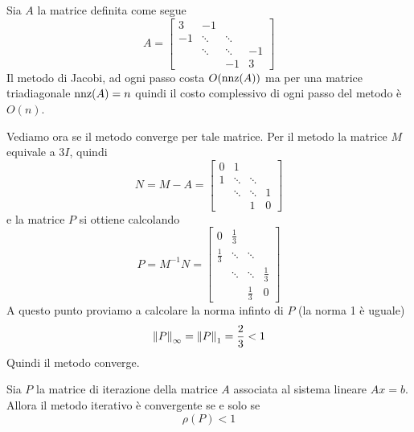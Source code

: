 \begin{example}
	Sia $A$ la matrice definita come segue
	\[
		A = \begin{bmatrix}
			3  & -1     &        &    \\
			-1 & \ddots & \ddots &    \\
			   & \ddots & \ddots & -1 \\
			   &        & -1     & 3
		\end{bmatrix}
	\]
	Il metodo di Jacobi, ad ogni passo costa $O(\operatorname{nnz}(A))$ ma per una matrice triadiagonale $\operatorname{nnz}(A) = n$ quindi
	il costo complessivo di ogni passo del metodo è $O(n)$.

	Vediamo ora se il metodo converge per tale matrice. Per il metodo la matrice $M$ equivale a $3I$, quindi
	\[
		N = M - A = \begin{bmatrix}
			0 & 1      &        &   \\
			1 & \ddots & \ddots &   \\
			  & \ddots & \ddots & 1 \\
			  &        & 1      & 0
		\end{bmatrix}
	\]
	e la matrice $P$ si ottiene calcolando
	\[
		P = M^{-1} N = \begin{bmatrix}
			0           & \frac{1}{3} &             &             \\
			\frac{1}{3} & \ddots      & \ddots      &             \\
			            & \ddots      & \ddots      & \frac{1}{3} \\
			            &             & \frac{1}{3} & 0
		\end{bmatrix}
	\]
	A questo punto proviamo a calcolare la norma infinto di $P$ (la norma 1 è uguale)
	\[ \left\lVert P\right\rVert_\infty = \left\lVert P\right\rVert_1 = \frac{2}{3} < 1 \]
	Quindi il metodo converge.
\end{example}

\begin{theorem}\label{th: convergenza_spettrale}
	Sia $P$ la matrice di iterazione della matrice $A$ associata al sistema lineare $Ax = b$. Allora il metodo
	iterativo è convergente se e solo se
	\[ \rho (P) < 1 \]
\end{theorem}

